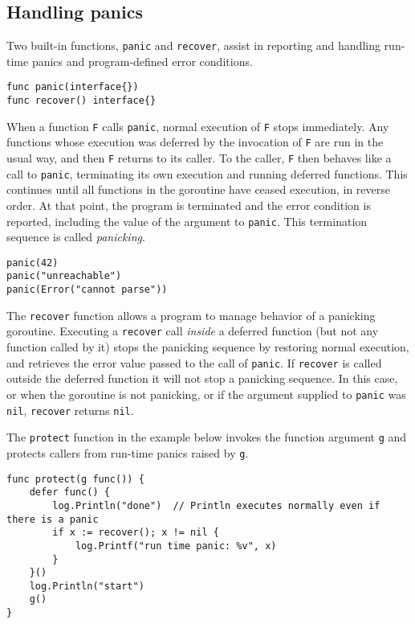 \subsection*{Handling panics}

Two built-in functions, \texttt{panic} and \texttt{recover}, assist in
reporting and handling run-time panics and
program-defined error conditions.

\begin{Verbatim}[frame=single]
func panic(interface{})
func recover() interface{}
\end{Verbatim}

When a function \texttt{F} calls \texttt{panic}, normal execution
of \texttt{F} stops immediately. Any functions whose execution was
deferred by the invocation of \texttt{F} are run in the usual way,
and then \texttt{F} returns to its caller. To the caller, \texttt{F}
then behaves like a call to \texttt{panic}, terminating its own
execution and running deferred functions. This continues until all
functions in the goroutine have ceased execution, in reverse order.
At that point, the program is terminated and the error condition
is reported, including the value of the argument to \texttt{panic}.
This termination sequence is called \emph{panicking}.

\begin{Verbatim}[frame=single]
panic(42)
panic("unreachable")
panic(Error("cannot parse"))
\end{Verbatim}

The \texttt{recover} function allows a program to manage behavior of a
panicking goroutine. Executing a \texttt{recover} call \emph{inside} a
deferred function (but not any function called by it) stops the
panicking sequence by restoring normal execution, and retrieves the
error value passed to the call of \texttt{panic}. If \texttt{recover} is
called outside the deferred function it will not stop a panicking
sequence. In this case, or when the goroutine is not panicking, or if
the argument supplied to \texttt{panic} was \texttt{nil},
\texttt{recover} returns \texttt{nil}.

The \texttt{protect} function in the example below invokes the function
argument \texttt{g} and protects callers from run-time panics raised by
\texttt{g}.

\begin{Verbatim}[frame=single]
func protect(g func()) {
    defer func() {
        log.Println("done")  // Println executes normally even if there is a panic
        if x := recover(); x != nil {
            log.Printf("run time panic: %v", x)
        }
    }()
    log.Println("start")
    g()
}
\end{Verbatim}

